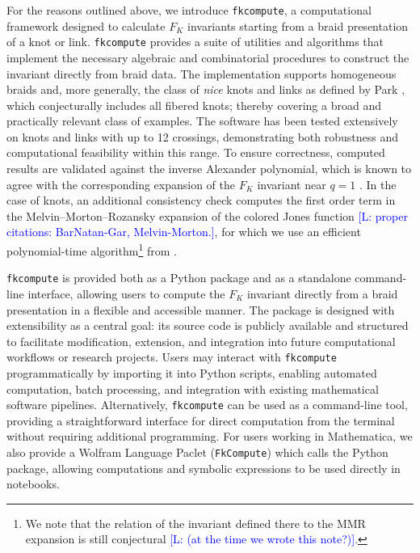\documentclass[twocolumn]{article}
\newcommand{\Lara}[1]{\textcolor{blue}{[L: #1]}}
\begin{document}
For the reasons outlined above, we introduce \texttt{fkcompute}, a computational framework designed to calculate $F_K$ invariants starting from a braid presentation of a knot or link.
\texttt{fkcompute} provides a suite of utilities and algorithms that implement the necessary algebraic and combinatorial procedures to construct the invariant directly from braid data.
The implementation supports homogeneous braids and, more generally, the class of \emph{nice} knots and links as defined by Park \cite{ParkThesis}, which conjecturally includes all fibered knots; thereby covering a broad and practically relevant class of examples. 
The software has been tested extensively on knots and links with up to 12 crossings, demonstrating both robustness and computational feasibility within this range.
To ensure correctness, computed results are validated against the inverse Alexander polynomial, which is known to agree with the corresponding expansion of the $F_K$ invariant near $q = 1$ \cite{Park21}. In the case of knots, an additional consistency check computes the first order term in the Melvin--Morton--Rozansky expansion of the colored Jones function \cite{RozMMR,RozMMRConj} \Lara{proper citations: BarNatan-Gar, Melvin-Morton.}, for which we use an efficient polynomial-time algorithm\footnote{We note that the relation of the invariant defined there to the MMR expansion is still conjectural \Lara{(at the time we wrote this note?)}.} from \cite{BNVdV18}.

\texttt{fkcompute} is provided both as a Python package and as a standalone command-line interface, allowing users to compute the $F_K$ invariant directly from a braid presentation in a flexible and accessible manner.
The package is designed with extensibility as a central goal: its source code is publicly available and structured to facilitate modification, extension, and integration into future computational workflows or research projects.
Users may interact with \texttt{fkcompute} programmatically by importing it into Python scripts, enabling automated computation, batch processing, and integration with existing mathematical software pipelines.
Alternatively, \texttt{fkcompute} can be used as a command-line tool, providing a straightforward interface for direct computation from the terminal without requiring additional programming.
For users working in Mathematica, we also provide a Wolfram Language Paclet (\texttt{FkCompute}) which calls the Python package, allowing computations and symbolic expressions to be used directly in notebooks.
\end{document}
